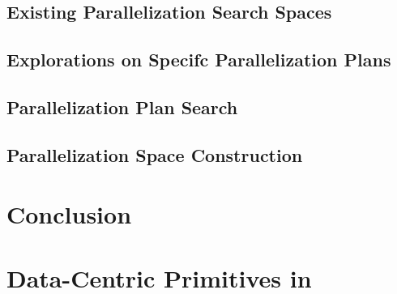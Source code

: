 \subsection{Existing Parallelization Search Spaces}

\subsection{Explorations on Specifc Parallelization Plans}

\subsection{Parallelization Plan Search}

\subsection{Parallelization Space Construction}

\section{Conclusion}






\appendix

\section{Data-Centric Primitives in \name{}}

